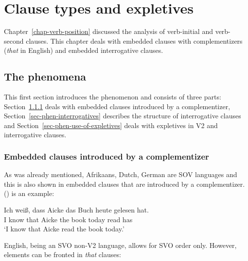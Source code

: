 \chapter{Clause types and expletives}
\label{chap-expletives}


Chapter~\ref{chap-verb-position} discussed the analysis of verb-initial and verb-second clauses. This chapter deals
with embedded clauses with complementizers (\eg \emph{that} in English) and embedded interrogative
clauses. 


\section{The phenomena}


This first section introduces the phenomenon and consists of three parts: Section~\ref{sec-complementizer} deals with embedded
clauses introduced by a complementizer, Section~\ref{sec-phen-interrogatives} describes the
structure of interrogative clauses and Section~\ref{sec-phen-use-of-expletives} deals with expletives in V2 and interrogative clauses.


\subsection{Embedded clauses introduced by a complementizer}
\label{sec-complementizer}

As was already mentioned, Afrikaans, Dutch, German are SOV languages and this is also shown in embedded
clauses that are introduced by a complementizer. () is an example:

\ea
\gll Ich weiß, dass Aicke das Buch heute gelesen hat.\\
     I know that Aicke the book today read has\\\german
\glt `I know that Aicke read the book today.'
\z



English, being an SVO non-V2 language, allows for SVO order only.
\z
However, elements can be fronted in \emph{that} clauses:
\eal
{}
\zl


